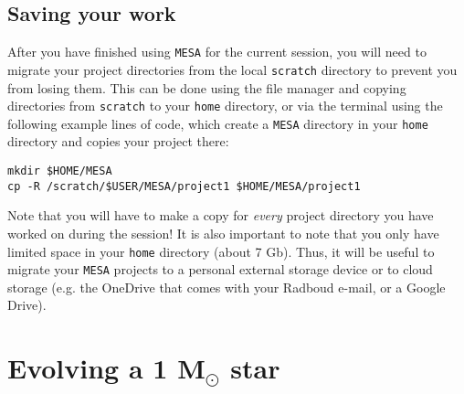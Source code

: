 \documentclass[11pt,a4paper]{article}
\begin{document}
\subsection{Saving your work}

After you have finished using \texttt{MESA} for the current session, you will need to migrate your project directories from the local \texttt{scratch} directory to prevent you from losing them. This can be done using the file manager and copying directories from \texttt{scratch} to your \texttt{home} directory, or via the terminal using the following example lines of code, which create a \texttt{MESA} directory in your \texttt{home} directory and copies your project there:

\begin{lstlisting}
mkdir $HOME/MESA
cp -R /scratch/$USER/MESA/project1 $HOME/MESA/project1
\end{lstlisting}

\noindent
Note that you will have to make a copy for \emph{every} project directory you have worked on during the session! It is also important to note that you only have limited space in your \texttt{home} directory (about 7 Gb). Thus, it will be useful to migrate your \texttt{MESA} projects to a personal external storage device or to cloud storage (e.g. the OneDrive that comes with your Radboud e-mail, or a Google Drive). 


\section{Evolving a 1 \texorpdfstring{M$_\odot$}{Msun} star}
\end{document}
